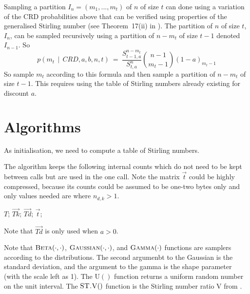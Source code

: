 \documentclass{article}
\begin{document}
Sampling a partition $I_n=(m_1,...,m_t)$ of $n$ of size $t$ 
can done using a variation of the CRD probabilities above
that can be verified using properties of the 
generalised Stirling number (see Theorem~17(ii) in \cite{Bun12}).
The partition of $n$ of size $t$, $I_n$, can be sampled
recursively using a partition of $n-m_t$ of size $t-1$
denoted $I_{n-1}$.  So
\[
p(m_t\,\mid\, CRD,a,b,n,t) ~=~
 \frac{S^{n-m_t}_{t-1,a}}{S^n_{t,a}} {n-1 \choose m_t-1} (1-a)_{m_t-1} 
\]
So sample $m_t$ according to this formula and then 
sample a partition of $n-m_t$ of size $t-1$.
This requires using the table of Stirling numbers already existing
for discount $a$.

\section{Algorithms}

As initialisation, we need to compute a table of Stirling numbers.

\noindent
The algorithm keeps the following internal counts
which do not need to be kept between calls but are
used in the one call.
Note the matrix $\vec{t}$ could be highly compressed, because
its counts could be assumed to be one-two bytes only
and only values needed are where $n_{d,k}>1$.
\begin{algorithmic}[5]
    \State $T$;
    \State $\vec{Tk}$;
    \State $\vec{Td}$;
    \State $\vec{t}$; 
\end{algorithmic}
Note that $\vec{Td}$ is only used when $a>0$.

Note that $\mbox{\sc Beta}(\cdot,\cdot)$,
$\mbox{\sc Gaussian}(\cdot,\cdot)$,
and $\mbox{\sc Gamma}(\cdot)$ functions are samplers
according to the distributions.
The second argumenbt to the Gaussian is the standard deviation,
and the argument to the gamma is the shape parameter
(with the scale left as 1).
The $\mbox{U}()$ function returns a uniform random number
on the unit interval.
The $\mbox{\sc ST.V}()$ function is the Stirling number ratio V
from \cite{Bun12}.
\end{document}
